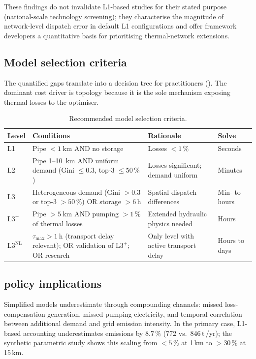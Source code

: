 \documentclass[a4paper,fleqn]{cas-dc}
\newcommand{\Lplus}{\mathrm{L3}^{+}}
\newcommand{\Lnl}{\mathrm{L3}^{\mathrm{NL}}}
\begin{document}
These findings do not invalidate L1-based studies for their
stated purpose (national-scale technology screening); they
characterise the magnitude of network-level dispatch error in
default L1 configurations and offer framework developers a
quantitative basis for prioritising thermal-network extensions.

\subsection{Model selection criteria}
\label{sec:disc_criteria}

The quantified gaps translate into a decision tree for
practitioners (). The dominant cost driver is
topology because it is the sole mechanism exposing thermal losses
to the optimiser.

\begin{table}[!ht]
\raggedright
\caption{Recommended model selection criteria.}
\label{tab:criteria}
\footnotesize
\begin{tabularx}{\textwidth}{@{} l X X l @{}}
\toprule
Level & Conditions & Rationale & Solve \\
\midrule
L1
  & Pipe ${<}\SI{1}{\kilo\metre}$ AND no storage
  & Losses ${<}1\,\%$
  & Seconds \\[4pt]
L2
  & Pipe 1--\SI{10}{\kilo\metre} AND uniform demand
    (Gini ${\leq}0.3$, top-3 ${\leq}50\,\%$)
  & Losses significant; demand uniform
  & Minutes \\[4pt]
L3
  & Heterogeneous demand
    (Gini ${>}0.3$ or top-3 ${>}50\,\%$) OR
    storage ${>}6$\,h
  & Spatial dispatch differences
  & Min- to hours \\[4pt]
$\Lplus$
  & Pipe ${>}\SI{5}{\kilo\metre}$ AND pumping ${>}1\,\%$
    of thermal losses
  & Extended hydraulic physics needed
  & Hours \\[4pt]
$\Lnl$
  & $\tau_{\max} > \SI{1}{\hour}$ (transport delay relevant);
    OR validation of $\Lplus$;
    OR research
  & Only level with active transport delay
  & Hours to days \\
\bottomrule
\end{tabularx}
\end{table}
\subsection{ policy implications}
\label{sec:disc_co2}

Simplified models underestimate  through compounding
channels: missed loss-compensation generation, missed pumping
electricity, and temporal correlation between additional demand
and grid emission intensity. In the primary case, L1-based
accounting underestimates emissions by $8.7\,\%$ (772
vs.\ 846\,t\,/yr); the synthetic parametric study shows this scaling
from ${<}5\,\%$ at 1\,km to ${>}30\,\%$ at 15\,km.
\end{document}
